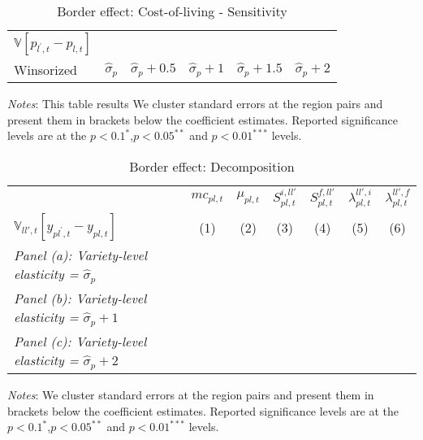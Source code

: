 \begin{table}[H]
    \centering
    \caption{Border effect: Cost-of-living - Sensitivity}
    \label{tab: app_border_effects_cle_sens}
    \begin{spacing}{1.1}
        \begin{tabular}{lccccc} \toprule 
            $\mathbb{V}\left[p_{l^{'},t}-p_{l,t}\right]$ & & & & & \\ 
            Winsorized & $\hat{\sigma}_p$ & $\hat{\sigma}_p+0.5$ & $\hat{\sigma}_p+1$ & $\hat{\sigma}_p+1.5$ & $\hat{\sigma}_p+2$  \\ 
            \midrule
            
        \end{tabular}
    \end{spacing}
    \parbox{\textwidth}{
    \begin{spacing}{1} 
        {\footnotesize 
        \textit{Notes}: This table results We cluster standard errors at the region pairs and present them in brackets below the coefficient estimates. Reported significance levels are at the $p<0.1^{*}$,$p<0.05^{**}$ and $p<0.01^{***}$ levels.} 
\end{spacing}}
\end{table}

\begin{table}[H]
    \centering
    \caption{Border effect: Decomposition}
    \label{tab: border_effects_decomp_sens}
    \begin{spacing}{1.1}
        \begin{tabular}{lcccccc} \toprule 
             & $mc_{pl,t}$ & $\mu_{pl,t}$ & $S^{i,ll'}_{pl,t}$ & $S^{f,ll'}_{pl,t}$
                & $\lambda^{ll',i}_{pl,t}$ & $\lambda^{ll',f}_{pl,t}$ \\ 
            $\mathbb{V}_{ll',t}\left[y_{pl^{'},t}-y_{pl,t}\right]$ & (1) & (2) & (3) & (4) & (5) & (6) \\ \midrule
            \textit{Panel (a): Variety-level elasticity = $\hat{\sigma}_p$} & & & & & & \\ 
            
            \textit{Panel (b): Variety-level elasticity = $\hat{\sigma}_p + 1$} & & & & & & \\
            
            \textit{Panel (c): Variety-level elasticity = $\hat{\sigma}_p + 2$} & & & & & & \\
            
    \end{tabular}
\end{spacing}
    \parbox{\textwidth}{
    \begin{spacing}{1} 
        {\footnotesize 
        \textit{Notes}: We cluster standard errors at the region pairs and present them in brackets below the coefficient estimates. Reported significance levels are at the $p<0.1^{*}$,$p<0.05^{**}$ and $p<0.01^{***}$ levels.} 
\end{spacing}}
\end{table} 
